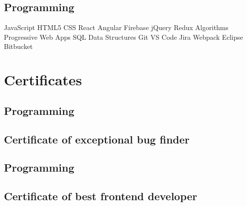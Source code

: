 \documentclass{resumecustom}%
\begin{document}
\begin{minipage}[t]{0.31\textwidth}
\subsection{Programming}%
\textbf{}%
JavaScript \textbullet{} HTML5 \textbullet{} CSS \textbullet{} React \textbullet{} Angular%
\newline%
\textbf{
}%
 \textbullet{} Firebase%
 \textbullet{} jQuery%
 \textbullet{} Redux%
 \textbullet{} Algorithms%
 \textbullet{} Progressive Web Apps%
 \textbullet{} SQL%
 \textbullet{} Data Structures%
\newline%
\textbf{
}%
 \textbullet{} Git%
 \textbullet{} VS Code%
 \textbullet{} Jira%
 \textbullet{} Webpack%
 \textbullet{} Eclipse%
 \textbullet{} Bitbucket

%
\sectionsep%
\section{Certificates}%
\label{sec:Certificates}%

%
\subsection{Programming}%
\subsection{Certificate of exceptional bug finder}
%
%
\sectionsep%
\subsection{Programming}%
\subsection{Certificate of best frontend developer}
%
%
\sectionsep%
\sectionsep%
\end{minipage}%
\hfill%
\end{document}
